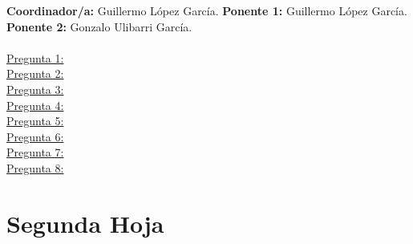 \documentclass[]{article}
\begin{document}
\textbf{Coordinador/a: } Guillermo López García. \newline
\textbf{Ponente 1: } Guillermo López García. \newline
\textbf{Ponente 2: } Gonzalo Ulibarri García.
\\
\\
\underline{Pregunta 1:} \\
\underline{Pregunta 2:} \\
\underline{Pregunta 3:} \\
\underline{Pregunta 4:} \\
\underline{Pregunta 5:} \\
\underline{Pregunta 6:} \\
\underline{Pregunta 7:} \\
\underline{Pregunta 8:} \\

\newpage

\section{Segunda Hoja}
\begin{table}[h!]
  \centering
  \begin{center}
    \caption{Tabla profesor}
  \end{center}
\end{table}

\newpage
\end{document}
